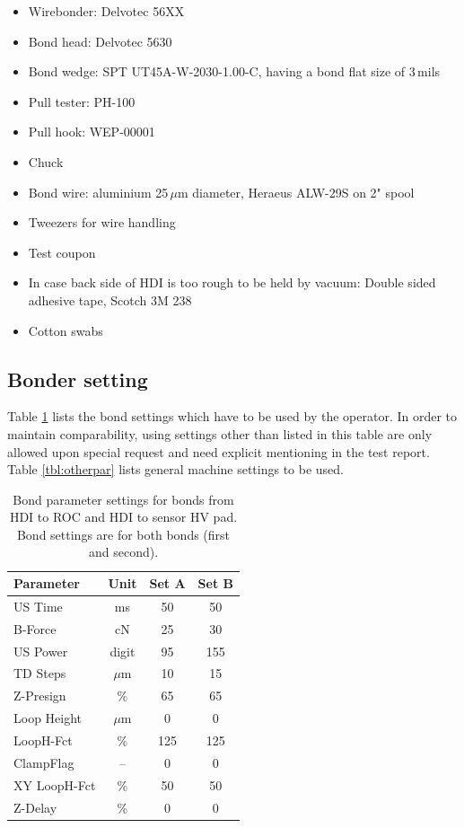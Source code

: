 \documentclass[10pt]{unlsilabsop}
\begin{document}
\begin{itemize}
    \item Wirebonder: Delvotec 56XX
    \item Bond head: Delvotec 5630
    \item Bond wedge: SPT UT45A-W-2030-1.00-C, having a bond flat size of 3\,mils
    \item Pull tester: PH-100
    \item Pull hook: WEP-00001
    \item Chuck
    \item Bond wire: aluminium 25\,$\mu$m diameter, Heraeus ALW-29S on 2" spool
    \item Tweezers for wire handling
    \item Test coupon
    \item In case back side of HDI is too rough to be held by vacuum: Double sided adhesive tape, Scotch 3M 238
    \item Cotton swabs
\end{itemize}

\subsection{Bonder setting}

Table \ref{tbl:bondpar} lists the bond settings which have to be used by the operator. In order to maintain comparability, using settings other than listed in this table are only allowed upon special request and need explicit mentioning in the test report. Table \ref{tbl:otherpar} lists general machine settings to be used.

\begin{table}[hH]
\begin{center}
\caption{Bond parameter settings for bonds from HDI to ROC and HDI to sensor HV pad. Bond settings are for both bonds (first and second).}
\label{tbl:bondpar}

\bigskip

\begin{tabular}{lc|c|c}
\toprule
Parameter & Unit & Set A & Set B  \\
    \midrule
US Time      &  ms    &  50 &  50 \\
B-Force      &  cN    &  25 &  30 \\
US Power     & digit  &  95 & 155 \\
TD Steps     & $\mu$m &  10 &  15 \\
    \midrule
Z-Presign    & \%     &  65 &  65 \\
Loop Height  & $\mu$m &   0 &   0 \\
LoopH-Fct    & \%     & 125 & 125 \\
ClampFlag    & --     &   0 &   0 \\
XY LoopH-Fct & \%     &  50 &  50 \\
Z-Delay      & \%     &   0 &   0 \\
   \bottomrule
\end{tabular}
\end{center}
\end{table}
\end{document}
